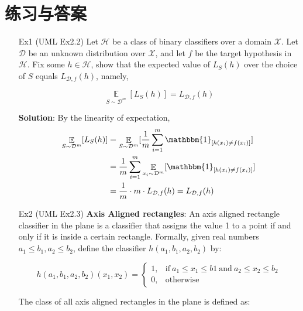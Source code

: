 \documentclass{article}
\begin{document}
\section{练习与答案}

\begin{itemize}
\item[Ex1] (UML Ex2.2) Let $\mathcal{H}$ be a class of binary classifiers over a domain $\mathcal{X}$. Let $\mathcal{D}$ be an unknown distribution over $\mathcal{X}$, and let $f$ be the target hypothesis in $\mathcal{H}$. Fix some $h\in\mathcal{H}$, show that the expected value of $L_S(h)$ over the choice of $S$ equals $L_{\mathcal{D},f}(h)$, namely,

\begin{equation*}
\mathop\mathbb{E}\limits_{S\sim\mathcal{D}^m}[L_S(h)]=L_{\mathcal{D},f}(h)
\end{equation*}

\item[] \textbf{Solution}: By the linearity of expectation,
\begin{equation*}
\begin{split}
\mathop\mathbb{E}\limits_{S\sim\mathcal{D}^m}[L_S(h)] 
&= \mathop\mathbb{E}\limits_{S\sim\mathcal{D}^m}[\frac{1}{m}\sum_{i=1}^m \mathbbm{1}_{[h(x_i)\neq f(x_i)]}] \\
&= \frac{1}{m}\sum_{i=1}^m \mathop\mathbb{E}\limits_{x_i \sim\mathcal{D}^m}[\mathbbm{1}_{[h(x_i)\neq f(x_i)]}] \\
&= \frac{1}{m} \cdot m \cdot L_{\mathcal{D},f}(h) = L_{\mathcal{D},f}(h)
\end{split}
\end{equation*}

\item[Ex2] (UML Ex2.3) \textbf{Axis Aligned rectangles}: An axis aligned rectangle classifier in the plane is a classifier that assigns the value 1 to a point if and only if it is inside a certain rectangle. Formally, given real numbers $a_1\leq b_1,a_2\leq b_2$, define the classifier $h(a_1,b_1,a_2,b_2)$ by:

	\begin{equation*}
	h(a_1,b_1,a_2,b_2)(x_1, x_2) = \left\{\begin{matrix}
	1,& \mathrm{if}\ a_1 \leq x_1 \leq b1\ \mathrm{and}\  a_2 \leq x_2 \leq b_2 \\
	0,& \mathrm{otherwise}
	\end{matrix}\right.
	\end{equation*}

	The class of all axis aligned rectangles in the plane is defined as:
	

\end{itemize}
\end{document}
